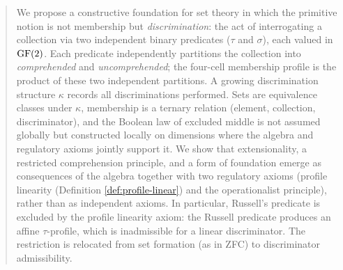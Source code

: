 \begin{abstract}
We propose a constructive foundation for set theory in which the primitive
notion is not membership but \emph{discrimination}: the act of
interrogating a collection via two independent binary predicates
($\tau$ and $\sigma$), each valued in $\GF(2)$. Each predicate
independently partitions the collection into
\emph{comprehended} and \emph{uncomprehended}; the four-cell
membership profile is the product of these two independent
partitions.
A growing discrimination structure $\kappa$ records all discriminations
performed. Sets are equivalence classes under $\kappa$, membership is a
ternary relation (element, collection, discriminator), and the Boolean
law of excluded middle is not assumed globally but
constructed locally on dimensions where the algebra and
regulatory axioms jointly support it. We show that extensionality, a restricted
comprehension principle, and a form of foundation emerge as consequences
of the algebra together with two regulatory axioms
(profile linearity (Definition \ref{def:profile-linear}) and the operationalist principle),
rather than as independent axioms. In particular, Russell's predicate
is excluded by the profile linearity axiom: the Russell predicate
produces an affine $\tau$-profile, which is inadmissible for a
linear discriminator. The restriction is relocated from set
formation (as in ZFC) to discriminator admissibility.
\end{abstract}

